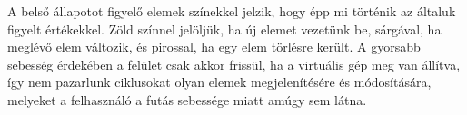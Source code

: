 A belső állapotot figyelő elemek színekkel jelzik, hogy épp mi történik az általuk figyelt értékekkel. Zöld színnel jelöljük, ha új elemet vezetünk be, sárgával, ha meglévő elem változik, és pirossal, ha egy elem törlésre került. A gyorsabb sebesség érdekében a felület csak akkor frissül, ha a virtuális gép meg van állítva, így nem pazarlunk ciklusokat olyan elemek megjelenítésére és módosítására, melyeket a felhasználó a futás sebessége miatt amúgy sem látna.
